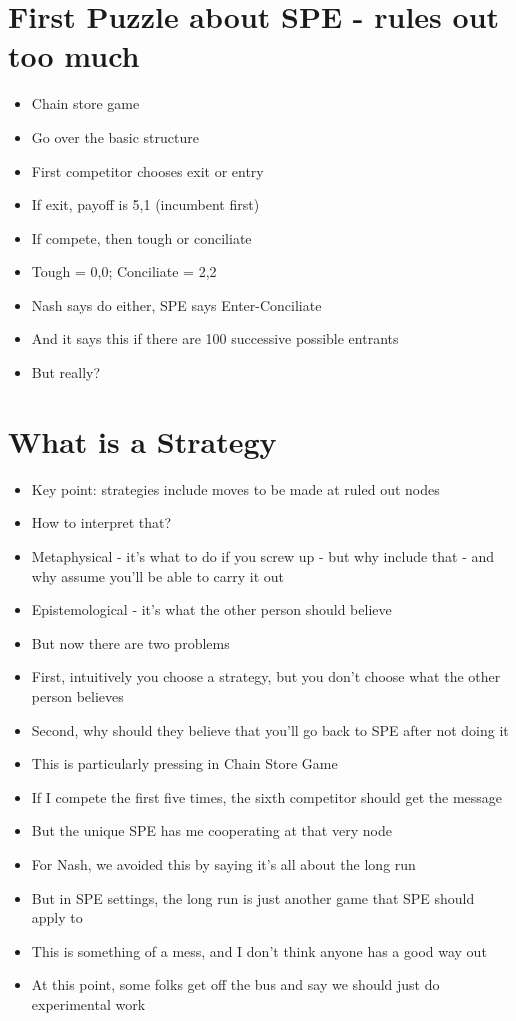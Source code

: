 \documentclass[11pt,]{article}
\providecommand{\tightlist}{%
  \setlength{\itemsep}{0pt}\setlength{\parskip}{0pt}}
\begin{document}
\hypertarget{first-puzzle-about-spe---rules-out-too-much}{%
\section{First Puzzle about SPE - rules out too
much}\label{first-puzzle-about-spe---rules-out-too-much}}

\begin{itemize}
\tightlist
\item
  Chain store game
\item
  Go over the basic structure
\item
  First competitor chooses exit or entry
\item
  If exit, payoff is 5,1 (incumbent first)
\item
  If compete, then tough or conciliate
\item
  Tough = 0,0; Conciliate = 2,2
\item
  Nash says do either, SPE says Enter-Conciliate
\item
  And it says this if there are 100 successive possible entrants
\item
  But really?
\end{itemize}

\hypertarget{what-is-a-strategy}{%
\section{What is a Strategy}\label{what-is-a-strategy}}

\begin{itemize}
\tightlist
\item
  Key point: strategies include moves to be made at ruled out nodes
\item
  How to interpret that?
\item
  Metaphysical - it's what to do if you screw up - but why include that
  - and why assume you'll be able to carry it out
\item
  Epistemological - it's what the other person should believe
\item
  But now there are two problems
\item
  First, intuitively you choose a strategy, but you don't choose what
  the other person believes
\item
  Second, why should they believe that you'll go back to SPE after not
  doing it
\item
  This is particularly pressing in Chain Store Game
\item
  If I compete the first five times, the sixth competitor should get the
  message
\item
  But the unique SPE has me cooperating at that very node
\item
  For Nash, we avoided this by saying it's all about the long run
\item
  But in SPE settings, the long run is just another game that SPE should
  apply to
\item
  This is something of a mess, and I don't think anyone has a good way
  out
\item
  At this point, some folks get off the bus and say we should just do
  experimental work
\end{itemize}
\end{document}
